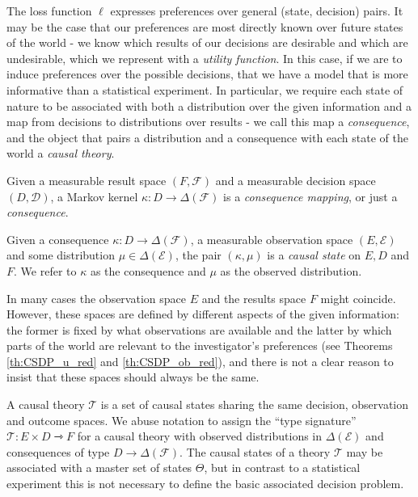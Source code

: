 The loss function $\ell$ expresses preferences over general (state, decision) pairs. It may be the case that our preferences are most directly known over future states of the world - we know which results of our decisions are desirable and which are undesirable, which we represent with a \emph{utility function}. In this case, if we are to induce preferences over the possible decisions, that we have a model that is more informative than a statistical experiment. In particular, we require each state of nature to be associated with both a distribution over the given information and a map from decisions to distributions over results - we call this map a \emph{consequence}, and the object that pairs a distribution and a consequence with each state of the world a \emph{causal theory}.

\begin{definition}[Consequences]
Given a measurable result space $(F,\mathcal{F})$ and a measurable decision space $(D,\mathcal{D})$, a Markov kernel $\kappa:D \to \Delta(\mathcal{F})$ is a \emph{consequence mapping}, or just a \emph{consequence}.
\end{definition}

\begin{definition}
Given a consequence $\kappa:D\to \Delta(\mathcal{F})$, a measurable observation space $(E,\mathcal{E})$ and some distribution $\mu\in \Delta(\mathcal{E})$, the pair $(\kappa,\mu)$ is a \emph{causal state} on $E, D$ and $F$. We refer to $\kappa$ as the consequence and $\mu$ as the observed distribution.
\end{definition}

In many cases the observation space $E$ and the results space $F$ might coincide. However, these spaces are defined by different aspects of the given information: the former is fixed by what observations are available and the latter by which parts of the world are relevant to the investigator's preferences (see Theorems \ref{th:CSDP_u_red} and \ref{th:CSDP_ob_red}), and there is not a clear reason to insist that these spaces should always be the same.

\begin{definition}\label{def:causal_theory}
A causal theory $\mathscr{T}$ is a set of causal states sharing the same decision, observation and outcome spaces. We abuse notation to assign the ``type signature'' $\mathscr{T}:E\times D\rightarrowtriangle F$ for a causal theory with observed distributions in $\Delta(\mathcal{E})$ and consequences of type $D\to \Delta(\mathcal{F})$. The causal states of a theory $\mathscr{T}$ may be associated with a master set of states $\Theta$, but in contrast to a statistical experiment this is not necessary to define the basic associated decision problem.
\end{definition}

